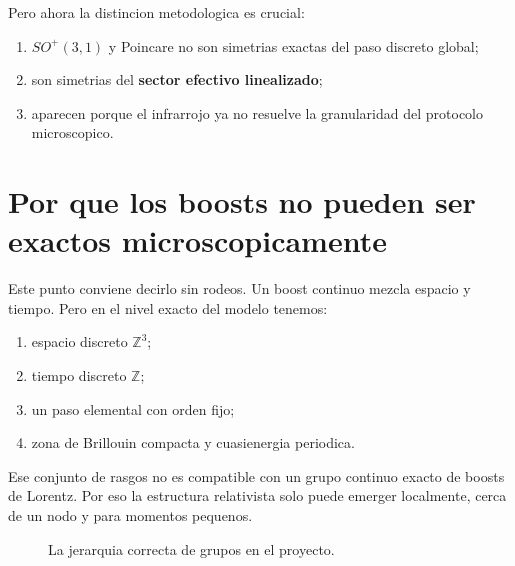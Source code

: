Pero ahora la distincion metodologica es crucial:
\begin{enumerate}[label=\arabic*.]
    \item \(SO^+(3,1)\) y Poincare no son simetrias exactas del paso discreto global;
    \item son simetrias del \textbf{sector efectivo linealizado};
    \item aparecen porque el infrarrojo ya no resuelve la granularidad del protocolo microscopico.
\end{enumerate}

\section{Por que los boosts no pueden ser exactos microscopicamente}
Este punto conviene decirlo sin rodeos. Un boost continuo mezcla espacio y tiempo. Pero en el nivel exacto del modelo tenemos:
\begin{enumerate}[label=\arabic*.]
    \item espacio discreto \(\mathbb{Z}^3\);
    \item tiempo discreto \(\mathbb{Z}\);
    \item un paso elemental con orden fijo;
    \item zona de Brillouin compacta y cuasienergia periodica.
\end{enumerate}

Ese conjunto de rasgos no es compatible con un grupo continuo exacto de boosts de Lorentz. Por eso la estructura relativista solo puede emerger localmente, cerca de un nodo y para momentos pequenos.

\begin{figure}[h!]
\centering
{}
\caption{La jerarquia correcta de grupos en el proyecto.}
\end{figure}

